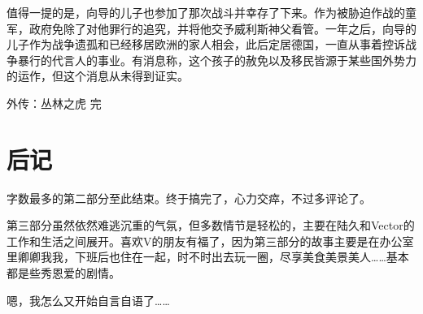 值得一提的是，向导的儿子也参加了那次战斗并幸存了下来。作为被胁迫作战的童军，政府免除了对他罪行的追究，并将他交予威利斯神父看管。一年之后，向导的儿子作为战争遗孤和已经移居欧洲的家人相会，此后定居德国，一直从事着控诉战争暴行的代言人的事业。有消息称，这个孩子的赦免以及移民皆源于某些国外势力的运作，但这个消息从未得到证实。



外传：丛林之虎 完



\section{后记}

字数最多的第二部分至此结束。终于搞完了，心力交瘁，不过多评论了。

第三部分虽然依然难逃沉重的气氛，但多数情节是轻松的，主要在陆久和Vector的工作和生活之间展开。喜欢V的朋友有福了，因为第三部分的故事主要是在办公室里卿卿我我，下班后也住在一起，时不时出去玩一圈，尽享美食美景美人……基本都是些秀恩爱的剧情。

嗯，我怎么又开始自言自语了……
